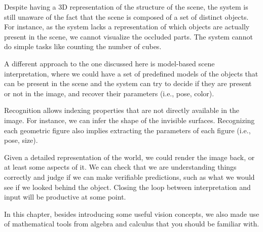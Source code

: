 Despite having a 3D representation of the structure of the scene, the system is still unaware of the fact that the scene is composed of a set of distinct objects. For instance, as the system lacks a representation of which objects are actually present in the scene, we cannot visualize the occluded parts. The system cannot do simple tasks like counting the number of cubes. 

A different approach to the one discussed here is model-based scene interpretation, where we could have a set of predefined models of the objects that can be present in the scene and the system can try to decide if they are present or not in the image, and recover their parameters (i.e., pose, color).

Recognition allows indexing properties that are not directly available in the image. For instance, we can infer the shape of the invisible surfaces. Recognizing each geometric figure also implies extracting the parameters of each figure (i.e., pose, size).










Given a detailed representation of the world, we could render the image back, or at least some aspects of it. We can check that we are understanding things correctly and judge if we can make verifiable predictions, such as what we would see if we looked behind the object. Closing the loop between interpretation and input will be productive at some point.

In this chapter, besides introducing some useful vision concepts, we also made use of mathematical tools from algebra and calculus that you should be familiar with.

% 
